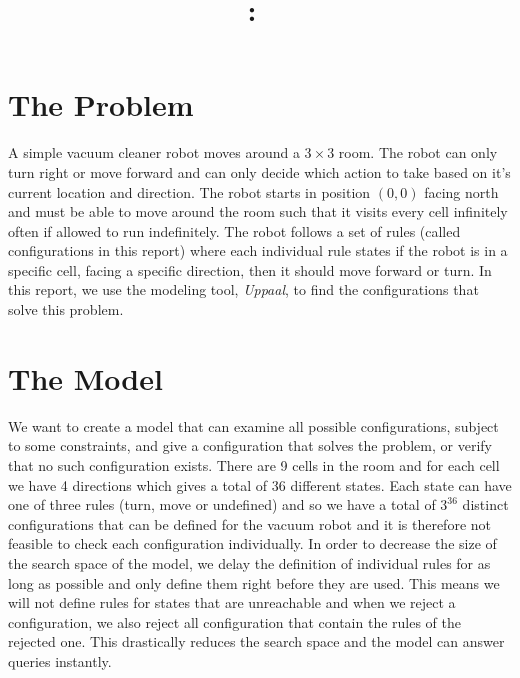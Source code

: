 \documentclass{article}
\title{
\vspace{2in}
\textmd{\textbf{\hmwkClass:\ \hmwkTitle}}\\
\vspace{0.1in}\large{\textit{\hmwkClassInstructor}}
\vspace{3in}
}
\author{\textbf{\hmwkAuthorName}}
\date{} %
\begin{document}
\maketitle



\newpage



\section{The Problem}
    A simple vacuum cleaner robot moves around a $3\times3$ room. The robot can only turn right or move forward and can only decide which action to take based on it's current location and direction. The robot starts in position $(0,0)$ facing north and must be able to move around the room such that it visits every cell infinitely often if allowed to run indefinitely. The robot follows a set of rules (called configurations in this report) where each individual rule states if the robot is in a specific cell, facing a specific direction, then it should move forward or turn. In this report, we use the modeling tool, \textit{Uppaal}, to find the configurations that solve this problem.

\section{The Model}
    We want to create a model that can examine all possible configurations, subject to some constraints, and give a configuration that solves the problem, or verify that no such configuration exists. There are 9 cells in the room and for each cell we have 4 directions which gives a total of 36 different states. Each state can have one of three rules (turn, move or undefined) and so we have a total of $3^{36}$ distinct configurations that can be defined for the vacuum robot and it is therefore not feasible to check each configuration individually. In order to decrease the size of the search space of the model, we delay the definition of individual rules for as long as possible and only define them right before they are used. This means we will not define rules for states that are unreachable and when we reject a configuration, we also reject all configuration that contain the rules of the rejected one. This drastically reduces the search space and the model can answer queries instantly.
\end{document}
